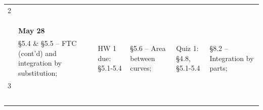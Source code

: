 \documentclass[11pt]{article}
\begin{document}
\begin{table}[ht!]
{\begin{tabular}{ | l | l | l | l | l | l |}
 2 & \begin{minipage}{0.18\textwidth}
{\bf May 24}\\
\end{minipage}
& \begin{minipage}{.18\textwidth}
{\bf May 25}\\
\end{minipage}
& \begin{minipage}{.18\textwidth}
{\bf May 26}\\
\end{minipage}
& \begin{minipage}{.18\textwidth}
{\bf May 27}\\
\end{minipage}
& \begin{minipage}{.18\textwidth}
{\bf May 28}
\end{minipage}\\

& \begin{minipage}{0.18\textwidth}
\S 5.4 \& \S 5.5 -- FTC (cont'd) and integration by substitution;
\end{minipage}
& \begin{minipage}{.18\textwidth}
HW 1 due: \S 5.1-5.4
\end{minipage}
& \begin{minipage}{.18\textwidth}
\S 5.6 -- Area between curves; 
\end{minipage}
& \begin{minipage}{.18\textwidth}
Quiz 1: \S 4.8, \S 5.1-5.4
\end{minipage}
& \begin{minipage}{.18\textwidth}
\S 8.2 -- Integration by parts;
\end{minipage}\\
\hline

3 & \begin{minipage}{0.18\textwidth}
{\bf May 31}\\
\end{minipage}
& \begin{minipage}{.18\textwidth}
{\bf June 1}\\
\end{minipage}
& \begin{minipage}{.18\textwidth}
{\bf June 2}\\
\end{minipage}
& \begin{minipage}{.18\textwidth}
{\bf June 3}\\
\end{minipage}
& \begin{minipage}{.18\textwidth}
{\bf June 4}\\
\end{minipage}\\


\end{tabular}}
\end{table}
\end{document}
